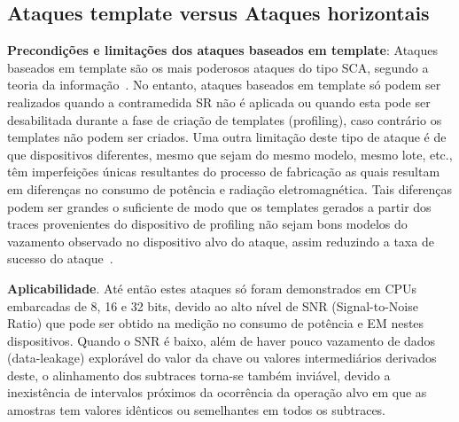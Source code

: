 \subsection{Ataques template versus Ataques horizontais}

\noindent \textbf{Precondições e limitações dos ataques baseados em template}: Ataques baseados em template são os mais poderosos ataques do tipo SCA, segundo a teoria da informação~\cite{ChariRaoRohatgi2003}. No entanto, ataques baseados em template só podem ser realizados quando a contramedida SR não é aplicada ou quando esta pode ser desabilitada durante a fase de criação de templates (profiling), caso contrário os templates não podem ser criados. Uma outra limitação deste tipo de ataque é de que dispositivos diferentes, mesmo que sejam do mesmo modelo, mesmo lote, etc., têm imperfeições únicas resultantes do processo de fabricação as quais resultam em diferenças no consumo de potência e radiação eletromagnética. Tais diferenças podem ser grandes o suficiente de modo que os templates gerados a partir dos traces provenientes do dispositivo de profiling não sejam bons modelos do vazamento observado no dispositivo alvo do ataque, assim reduzindo a taxa de sucesso do ataque~\cite{ElaabidGuilley2012}.


\noindent \textbf{Aplicabilidade}. Até então estes ataques só foram demonstrados em CPUs embarcadas de 8, 16 e 32 bits, devido ao alto nível de SNR (Signal-to-Noise Ratio) que pode ser obtido na medição no consumo de potência e EM nestes dispositivos. Quando o SNR é baixo, além de haver pouco vazamento de dados (data-leakage) explorável do valor da chave ou valores intermediários derivados deste, o alinhamento dos subtraces torna-se também inviável, devido a inexistência de intervalos próximos da ocorrência da operação alvo em que as amostras tem valores idênticos ou semelhantes em todos os subtraces.

